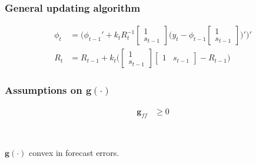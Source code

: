 \documentclass[10pt]{beamer}
\begin{document}
\begin{frame}[plain]  %
	\frametitle{General updating algorithm}
	\label{RLS}


\begin{align}
\phi_t  & = \bigg( \phi_{t-1}' + k_t R_t^{-1}\begin{bmatrix} 1 \\ s_{t-1} \end{bmatrix}\bigg(y_{t} - \phi_{t-1} \begin{bmatrix} 1 \\ s_{t-1} \end{bmatrix} \bigg)' \bigg)' \\
R_t &= R_{t-1} +  k_t \bigg( \begin{bmatrix} 1 \\ s_{t-1} \end{bmatrix} \begin{bmatrix} 1 & s_{t-1} \end{bmatrix}  - R_{t-1} \bigg)
\end{align}


\vfill

\hyperlink{adaptive_learning}{}	


\end{frame}

\begin{frame}[plain]  %
	\frametitle{Assumptions on $\mathbf{g}(\cdot)$}
	\label{ass_g}


\begin{align}
\mathbf{g}_{ff} & \geq 0 \label{ass_g2}
\end{align}

\

$\mathbf{g}(\cdot)$ convex in forecast errors.

\vfill

\hyperlink{cgain_dgain}{}	


\end{frame}
\end{document}
